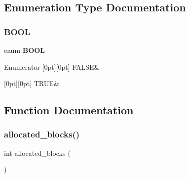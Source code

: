 \subsection{Enumeration Type Documentation}
\mbox{\label{memtrace_8cpp_a3e5b8192e7d9ffaf3542f1210aec18dd}} 
\subsubsection{B\+O\+OL}
{\footnotesize\ttfamily enum \textbf{ B\+O\+OL}}

\begin{DoxyEnumFields}{Enumerator}
[0pt][0pt]{}\mbox{\label{memtrace_8cpp_a3e5b8192e7d9ffaf3542f1210aec18ddaa1e095cc966dbecf6a0d8aad75348d1a}} 
F\+A\+L\+SE&\\
\hline

[0pt][0pt]{}\mbox{\label{memtrace_8cpp_a3e5b8192e7d9ffaf3542f1210aec18ddaa82764c3079aea4e60c80e45befbb839}} 
T\+R\+UE&\\
\hline

\end{DoxyEnumFields}


\subsection{Function Documentation}
\mbox{\label{memtrace_8cpp_a4ec27aa588e69e834e293374f5c14e67}} 
\subsubsection{allocated\+\_\+blocks()}
{\footnotesize\ttfamily int allocated\+\_\+blocks (\begin{DoxyParamCaption}{ }\end{DoxyParamCaption})}

\mbox{\label{memtrace_8cpp_ac6308f8e862dbc52b364a505483191a6}} 
